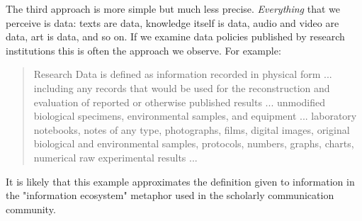 The third approach is more simple but much less precise. \textit{Everything} that we perceive is data: texts are data, knowledge itself is data, audio and video are data, art is data, and so on. If we examine data policies published by research institutions this is often the approach we observe. For example: 

\begin{quote}
Research Data is defined as information recorded in physical form ... including any records that would be used for the reconstruction and evaluation of reported or otherwise published results ... unmodified biological specimens, environmental samples, and equipment ... laboratory notebooks, notes of any type, photographs, films, digital images, original biological and environmental samples, protocols, numbers, graphs, charts, numerical raw experimental results ... \citep{jhu_2008}
\end{quote}

It is likely that this example approximates the definition given to information in the "information ecosystem" metaphor used in the scholarly communication community.
